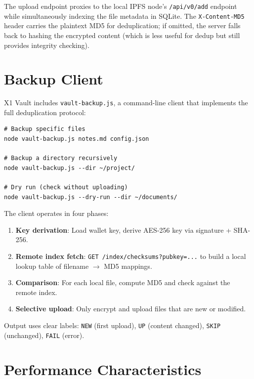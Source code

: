 \documentclass[11pt,a4paper]{article}
\begin{document}
The upload endpoint proxies to the local IPFS node's \texttt{/api/v0/add} endpoint while simultaneously indexing the file metadata in SQLite. The \texttt{X-Content-MD5} header carries the plaintext MD5 for deduplication; if omitted, the server falls back to hashing the encrypted content (which is less useful for dedup but still provides integrity checking).

\section{Backup Client}

X1 Vault includes \texttt{vault-backup.js}, a command-line client that implements the full deduplication protocol:

\begin{verbatim}
# Backup specific files
node vault-backup.js notes.md config.json

# Backup a directory recursively
node vault-backup.js --dir ~/project/

# Dry run (check without uploading)
node vault-backup.js --dry-run --dir ~/documents/
\end{verbatim}

The client operates in four phases:

\begin{enumerate}
    \item \textbf{Key derivation}: Load wallet key, derive AES-256 key via signature + SHA-256.
    \item \textbf{Remote index fetch}: \texttt{GET /index/checksums?pubkey=...} to build a local lookup table of filename $\rightarrow$ MD5 mappings.
    \item \textbf{Comparison}: For each local file, compute MD5 and check against the remote index.
    \item \textbf{Selective upload}: Only encrypt and upload files that are new or modified.
\end{enumerate}

Output uses clear labels: \texttt{NEW} (first upload), \texttt{UP} (content changed), \texttt{SKIP} (unchanged), \texttt{FAIL} (error).

\section{Performance Characteristics}
\end{document}
